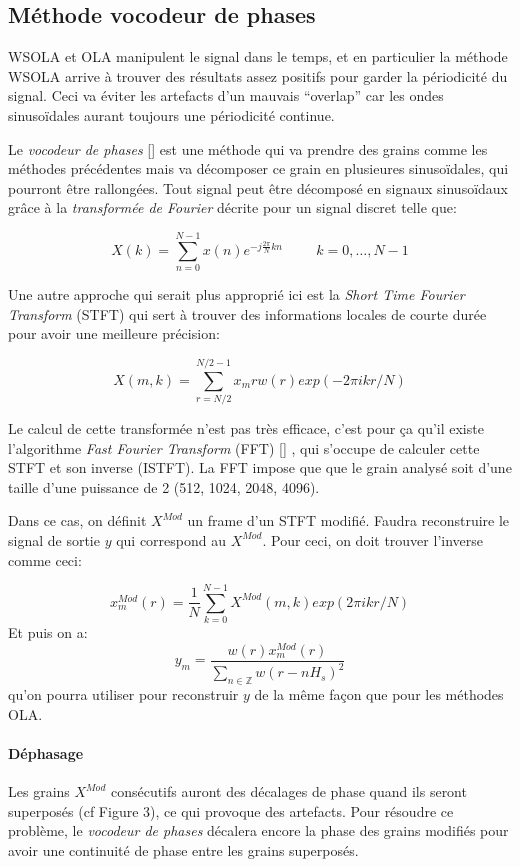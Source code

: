 \documentclass[letterpaper]{article}
\begin{document}
\subsection{Méthode vocodeur de phases}

WSOLA et OLA manipulent le signal dans le temps, et en particulier la méthode WSOLA arrive à trouver
des résultats assez positifs pour garder la périodicité du signal. Ceci va éviter les artefacts d'un
mauvais ``overlap'' car les ondes sinusoïdales aurant toujours une périodicité continue.

Le \emph{vocodeur de phases} [\cite{Flanagan}] est une méthode qui va prendre des grains comme les méthodes précédentes
mais va décomposer ce grain en plusieures sinusoïdales, qui pourront être rallongées. Tout signal peut
être décomposé en signaux sinusoïdaux grâce à la \emph{transformée de Fourier} décrite pour un
signal discret telle que:

$$ X(k) = \sum^{N-1}_{n=0} x(n)e^{-j\frac{2 \pi}{N}kn}  \hspace{1cm}  k = 0 , \dots,N-1$$

Une autre approche qui serait plus approprié ici est la \emph{Short Time Fourier Transform} (STFT)
qui sert à trouver des informations locales de courte durée pour avoir une meilleure précision:

$$ X(m,k) = \sum^{N / 2 - 1}_{ r = N/2} x_m{r} w(r) exp(-2\pi i k r / N)$$

Le calcul de cette transformée n'est pas très efficace, c'est pour ça qu'il existe l'algorithme
\emph{Fast Fourier Transform} (FFT)  [\cite{FFT}] , qui s'occupe de calculer cette STFT et son
inverse (ISTFT). La FFT impose que que le grain analysé soit d'une taille d'une puissance de 2
(512, 1024, 2048, 4096).

Dans ce cas, on définit $X^{Mod}$ un frame d'un STFT modifié. Faudra reconstruire le signal de sortie
$y$ qui correspond au $X^{Mod}$. Pour ceci, on doit trouver l'inverse comme ceci:

$$x_m^{Mod}(r) = \frac{1}{N} \sum_{k=0}^{N-1} X^{Mod}(m,k) exp(2\pi ikr / N)$$
Et puis on a:
$$y_m = \frac{w(r) x_m^{Mod}(r)}{\sum_{n \in \mathbb{Z}} w(r - nH_s)^2}$$
qu'on pourra utiliser pour reconstruir $y$ de la même façon que pour les méthodes OLA.

\paragraph{Déphasage} Les grains $X^{Mod}$ consécutifs auront des décalages de phase quand ils seront
superposés (cf Figure 3),
ce qui provoque des artefacts. Pour résoudre ce problème, le \emph{vocodeur de phases} décalera encore
la phase des grains modifiés pour avoir une continuité de phase entre les grains superposés.
\end{document}
